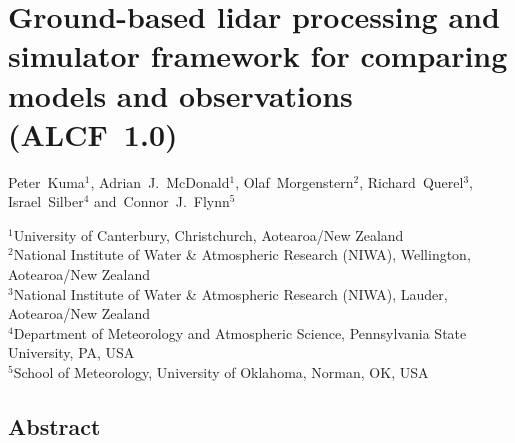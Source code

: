 \chapter{Ground-based lidar processing and simulator framework for comparing models and observations (ALCF~1.0)}

\vspace{-0.1cm}\begin{spacing}{1.2}\sffamily\raggedright
Peter~Kuma$^1$, Adrian~J.~McDonald$^1$, Olaf~Morgenstern$^2$, Richard~Querel$^3$, Israel~Silber$^4$ and~Connor~J.~Flynn$^5$
\end{spacing}

\vspace{0.4cm}\begin{spacing}{1.2}\footnotesize\sffamily\noindent\raggedright
$^1$University of Canterbury, Christchurch, Aotearoa/New Zealand\\
$^2$National Institute of Water \& Atmospheric Research (NIWA), Wellington, Aotearoa/New Zealand\\
$^3$National Institute of Water \& Atmospheric Research (NIWA), Lauder, Aotearoa/New Zealand\\
$^4$Department of Meteorology and Atmospheric Science, Pennsylvania State University, PA, USA\\
$^5$School of Meteorology, University of Oklahoma, Norman, OK, USA
\end{spacing}

\section*{Abstract}

